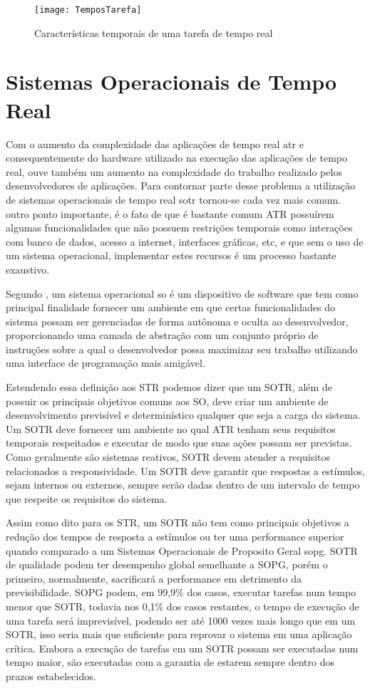 \begin{figure}[!htb]
    \centering
    \texttt{[image: TemposTarefa]}
    \caption{Características temporais de uma tarefa de tempo real}
    \label{TemposTarefa}
\end{figure}

\section{Sistemas Operacionais de Tempo Real}
Com o aumento da complexidade das aplicações de tempo real \gls{atr} e consequentemente do hardware utilizado na execução das aplicações de tempo real, ouve também um aumento na complexidade do trabalho realizado pelos desenvolvedores de aplicações. Para contornar parte desse problema a utilização de sistemas operacionais de tempo real \gls{sotr} tornou-se cada vez mais comum. outro ponto importante, é o fato de que é bastante comum ATR possuírem  algumas funcionalidades que não possuem restrições temporais como interações com banco de dados, acesso a internet, interfaces gráficas, etc, e que sem o uso de um sistema operacional, implementar estes recursos é um processo bastante exaustivo.  

Segundo \cite{Tanenbaum2009}, um sistema operacional \gls{so} é um dispositivo de software que tem como principal finalidade fornecer um ambiente em que certas funcionalidades do sistema possam ser gerenciadas de forma autônoma e oculta ao desenvolvedor, proporcionando uma camada de abstração com um conjunto próprio de instruções sobre a qual o desenvolvedor possa maximizar seu trabalho utilizando uma interface de programação mais amigável.

Estendendo essa definição aos STR podemos dizer que um SOTR, além de possuir os principais objetivos comuns aos SO, deve criar um ambiente de desenvolvimento previsível e determinístico qualquer que seja a carga do sistema. Um SOTR deve fornecer um ambiente no qual ATR tenham seus requisitos temporais respeitados e executar de modo que suas ações possam ser previstas. Como geralmente são sistemas reativos, SOTR devem atender a requisitos relacionados a responsividade. Um SOTR deve garantir que respostas a estímulos, sejam internos ou externos, sempre serão dadas dentro de um intervalo de tempo que respeite os requisitos do sistema.

Assim como dito para os STR, um SOTR não tem como principais objetivos a redução dos tempos de resposta a estímulos ou ter uma performance superior quando comparado a um Sistemas Operacionais de Proposito Geral \gls{sopg}. SOTR de qualidade podem ter desempenho global semelhante a SOPG, porém o primeiro, normalmente, sacrificará a performance em detrimento da previsibilidade. SOPG podem, em 99,9\% dos casos, executar tarefas num tempo menor que SOTR, todavia nos 0,1\% dos casos restantes, o tempo de execução de uma tarefa será imprevisível, podendo ser até 1000 vezes mais longo que em um SOTR, isso seria mais que suficiente para reprovar o sistema em uma aplicação crítica. Embora a execução de tarefas em um SOTR possam ser executadas num tempo maior, são executadas com a garantia de estarem sempre dentro dos  prazos estabelecidos.

